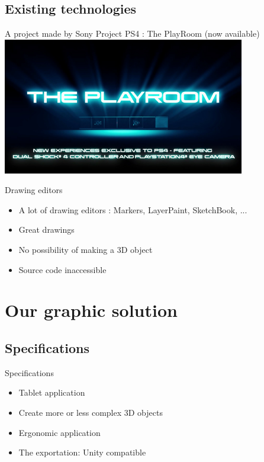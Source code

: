 \documentclass[a4paper,10pt]{beamer}
\begin{document}
	\begin{frame}
		\tableofcontents
	\end{frame}
		
		\subsection{Existing technologies}
			
			\begin{frame}{A project made by Sony}
				Project PS4 : The PlayRoom (now available)
				\href{run:The_PlayRoom.avi}{\includegraphics[width=300pt]{images/The-Playroom.jpg}}
			\end{frame}
			
			\begin{frame}{Drawing editors}
				\begin{itemize}
					\item A lot of drawing editors : Markers, LayerPaint, SketchBook, ...
					\item Great drawings
					\item No possibility of making a 3D object
					\item Source code inaccessible
				\end{itemize}
			\end{frame}
	
	\section{Our graphic solution}
		\subsection{Specifications}
		
		\begin{frame}{Specifications}
			\begin{itemize}
				\item Tablet application
				\item Create more or less complex 3D objects
				\item Ergonomic application
				\item The exportation: Unity compatible
			\end{itemize}
		\end{frame}
		
\end{document}

